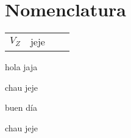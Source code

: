 \documentclass[11pt,a4paper]{article}
\begin{document}
	\pagestyle{fancy}
	\section*{Nomenclatura}
	
	\begin{tabular}{r l r l}
		$V_Z$ & jeje &&\\
	\end{tabular}
	\begin{multicols}{2}
		\begin{cajita}
			hola jaja
		\end{cajita}
		
		
		\begin{cajita}
			chau jeje
		\end{cajita}
	\end{multicols}

	\begin{cajita}
		buen día
	\end{cajita}

	\begin{multicols}{2}
		\begin{cajita}
			\begin{multicols}{2}
				
				
			\end{multicols}
			
		\end{cajita}
	
	
		\begin{cajita}
			chau jeje
		\end{cajita}
	\end{multicols}
\end{document}
